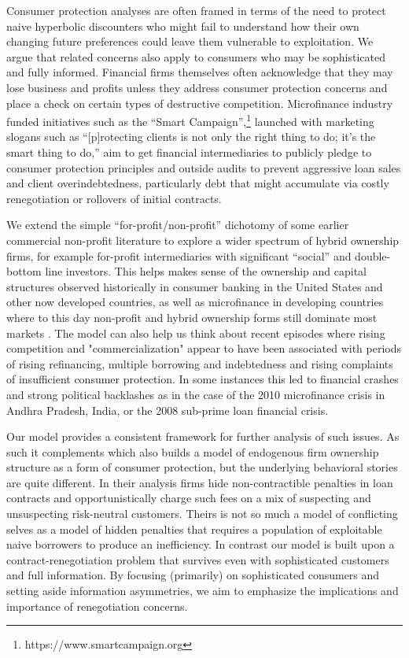 \documentclass[11pt,english]{article}
\theoremstyle{plain}
\theoremstyle{definition}
\begin{document}
Consumer protection analyses are often framed in terms of the need to protect naive hyperbolic discounters who might fail to understand how their own changing future preferences could leave them vulnerable to exploitation. We argue that related concerns also apply to consumers who may be sophisticated and fully informed. Financial firms themselves often acknowledge that they may lose business and profits unless they address consumer protection concerns and place a check on certain types of destructive competition. Microfinance
industry funded initiatives such as the ``Smart Campaign'',\footnote{https://www.smartcampaign.org} launched with marketing slogans such as ``{[}p{]}rotecting clients is not only the right thing to do; it's the smart thing to do,'' aim to get financial intermediaries to publicly pledge to consumer protection principles and outside audits to prevent aggressive loan sales and client overindebtedness, particularly debt that might accumulate via costly renegotiation or rollovers of initial contracts.

We extend the simple ``for-profit/non-profit'' dichotomy of some earlier commercial non-profit literature to explore a wider spectrum of hybrid ownership firms, for example for-profit intermediaries with significant  ``social'' and double-bottom line investors. This helps makes sense of the ownership and capital structures observed historically in consumer banking in the United States and other now developed countries, as well as microfinance in developing countries where to this day non-profit
and hybrid ownership forms still dominate most markets \citep{cull2009,conning2011}. The model can also help us think about recent episodes where rising competition and "commercialization" appear to have been associated with periods of rising refinancing, multiple borrowing and indebtedness and rising complaints of insufficient consumer protection. In some instances this led to financial crashes and strong political backlashes as in the case of the 2010 microfinance crisis in Andhra Pradesh, India, or the 2008 sub-prime loan financial crisis.

Our model provides a consistent framework for further analysis of such issues. As such it complements \citet{bubb2013} which also builds a model of endogenous
firm ownership structure as a form of consumer protection, but the
underlying behavioral stories are quite different. In their analysis
firms hide non-contractible penalties in loan contracts and opportunistically
charge such fees on a mix of suspecting and unsuspecting risk-neutral customers. Theirs is not so much a model of conflicting
selves as a model of hidden penalties that requires a population of
exploitable naive borrowers to produce an inefficiency. In contrast
our model is built upon a contract-renegotiation problem that survives even with sophisticated customers and full information. By focusing (primarily) on sophisticated consumers and setting aside information asymmetries, we aim to emphasize the implications and importance of renegotiation concerns.
\end{document}
